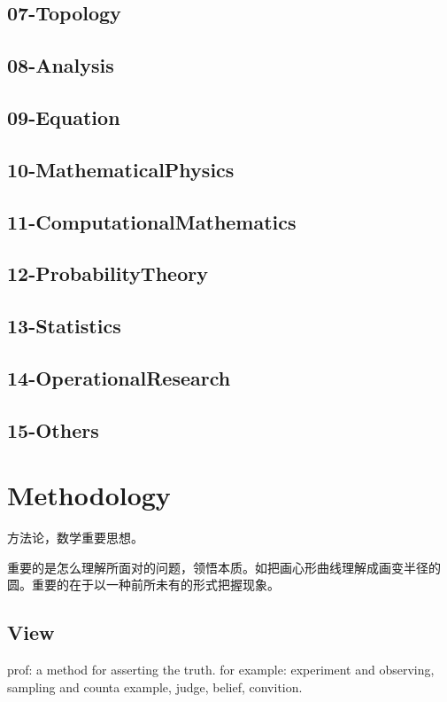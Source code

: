 \documentclass[UTF8]{../09-Mathematics}
\begin{document}
\section{07-Topology}
\section{08-Analysis}
\section{09-Equation}
\section{10-MathematicalPhysics}
\section{11-ComputationalMathematics}
\section{12-ProbabilityTheory}
\section{13-Statistics}
\section{14-OperationalResearch}
\section{15-Others}



\chapter{Methodology}
方法论，数学重要思想。

重要的是怎么理解所面对的问题，领悟本质。如把画心形曲线理解成画变半径的圆。重要的在于以一种前所未有的形式把握现象。

\section{View}



prof: a method for asserting the truth.
for example: experiment and observing, sampling and counta example, judge, belief, convition.
\end{document}

